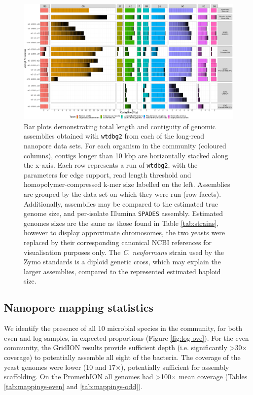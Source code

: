 \documentclass[a4paper,num-refs]{oup-contemporary}
\begin{document}
\begin{figure}[t!]
\centering
\includegraphics[width=\linewidth]{figures/w2.png}
\caption{Bar plots demonstrating total length and contiguity of genomic assemblies obtained with \texttt{wtdbg2} from each of the long-read nanopore data sets. For each organism in the community (coloured columns), contigs longer than 10 kbp are horizontally stacked along the x-axis. Each row represents a run of \texttt{wtdbg2}, with the parameters for edge support, read length threshold and homopolymer-compressed k-mer size labelled on the left. Assemblies are grouped by the data set on which they were run (row facets). Additionally, assemblies may be compared to the estimated true genome size, and per-isolate Illumina \texttt{SPADES} assembly. Estimated genomes sizes are the same as those found in Table \ref{tab:strains}, however to display approximate chromosomes, the two yeasts were replaced by their corresponding canonical NCBI references for visualisation purposes only. The \textit{C. neoformans} strain used by the Zymo standards is a diploid genetic cross, which may explain the larger assemblies, compared to the represented estimated haploid size.
}\label{fig:assemblies}
\end{figure}


\subsection{Nanopore mapping statistics}

We identify the presence of all 10 microbial species in the community, for both even and log samples, in expected proportions (Figure \ref{fig:log-ove}). For the even community, the GridION results provide sufficient depth (i.e. significantly >30$\times$ coverage) to potentially assemble all eight of the bacteria. The coverage of the yeast genomes were lower (10 and 17$\times$), potentially sufficient for assembly scaffolding. On the PromethION all genomes had >100$\times$ mean coverage (Tables \ref{tab:mappings-even} and \ref{tab:mappings-odd}).
\end{document}
